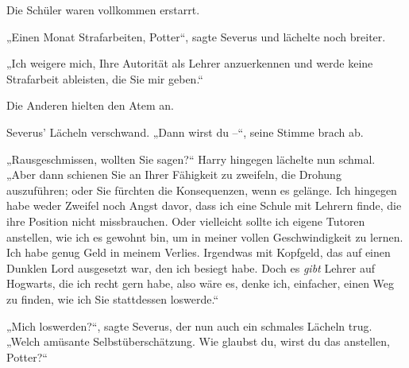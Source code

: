 Die Schüler waren vollkommen erstarrt.

„Einen Monat Strafarbeiten, Potter“, sagte Severus und lächelte noch breiter.

„Ich weigere mich, Ihre Autorität als Lehrer anzuerkennen und werde keine Strafarbeit ableisten, die Sie mir geben.“

Die Anderen hielten den Atem an.

Severus’ Lächeln verschwand. „Dann wirst du –“, seine Stimme brach ab.

„Rausgeschmissen, wollten Sie sagen?“ Harry hingegen lächelte nun schmal. „Aber dann schienen Sie an Ihrer Fähigkeit zu zweifeln, die Drohung auszuführen; oder Sie fürchten die Konsequenzen, wenn es gelänge. Ich hingegen habe weder Zweifel noch Angst davor, dass ich eine Schule mit Lehrern finde, die ihre Position nicht missbrauchen. Oder vielleicht sollte ich eigene Tutoren anstellen, wie ich es gewohnt bin, um in meiner vollen Geschwindigkeit zu lernen. Ich habe genug Geld in meinem Verlies. Irgendwas mit Kopfgeld, das auf einen Dunklen Lord ausgesetzt war, den ich besiegt habe. Doch es \emph{gibt} Lehrer auf Hogwarts, die ich recht gern habe, also wäre es, denke ich, einfacher, einen Weg zu finden, wie ich Sie stattdessen loswerde.“

„Mich loswerden?“, sagte Severus, der nun auch ein schmales Lächeln trug. „Welch amüsante Selbstüberschätzung. Wie glaubst du, wirst du das anstellen, Potter?“

